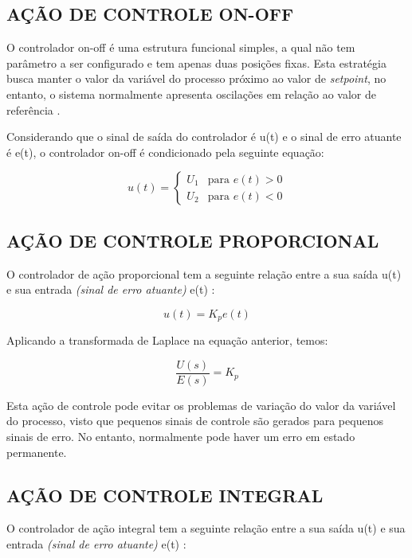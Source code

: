 \documentclass[12pt,oneside,a4paper, chapter=TITLE, section = TITLE, english, brazil]{abntex2}
\begin{document}
\subsection{AÇÃO DE CONTROLE ON-OFF} %

O controlador on-off é uma estrutura funcional simples, a qual não tem parâmetro a ser configurado e tem apenas duas posições fixas. Esta estratégia busca manter o valor da variável do processo  próximo ao valor de \textit{setpoint}, no entanto, o sistema normalmente apresenta oscilações em relação ao valor de referência \cite{astrom}.

Considerando que o sinal de saída do controlador é u(t) e o sinal de erro atuante é e(t), o controlador on-off é condicionado pela seguinte equação:

\begin{displaymath}
u(t) = \left\{ \begin{array}{ll}
U_{1} & \textrm{para $e(t)>0$}\\
U_{2} & \textrm{para $e(t)<0$}
\end{array} \right.
\end{displaymath}

\subsection{AÇÃO DE CONTROLE PROPORCIONAL} %

O controlador de ação proporcional tem a seguinte relação entre a sua saída u(t) e sua entrada \textit{(sinal de erro atuante)} e(t) \cite{ogata}:

$$u(t) = K_{p} e(t)$$

Aplicando a transformada de Laplace na equação anterior, temos:

\begin{equation}
\frac{U(s)}{E(s)} = K_{p} \label{eq:g_s_cont_prop}
\end{equation}

Esta ação de controle pode evitar os problemas de variação do valor da variável do processo, visto que pequenos sinais de controle são gerados para pequenos sinais de erro. No entanto, normalmente pode haver um erro em estado permanente.

\subsection{AÇÃO DE CONTROLE INTEGRAL} %

O controlador de ação integral tem a seguinte relação entre a sua saída u(t) e sua entrada \textit{(sinal de erro atuante)} e(t) \cite{ogata}:
\end{document}
